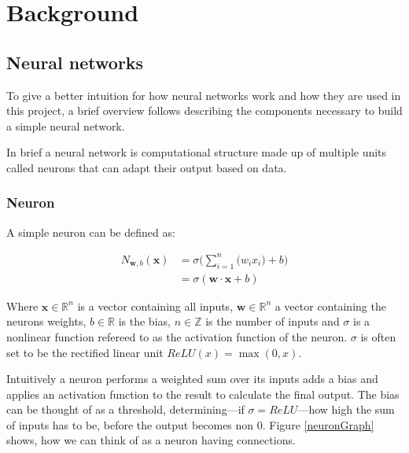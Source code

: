 
\newcommand{\neuronSum}[1][n]{
	\sigma\Bigg(\sum_{i=1}^{#1}{\Big(w_i x_i\Big)} + b\Bigg)
}

\chapter{Background}
\section{Neural networks}
To give a better intuition for how neural networks work and how they are used in this project, a brief overview follows describing the components necessary to build a simple neural network.

In brief a neural network is computational structure made up of multiple units called neurons that can adapt their output based on data.


\subsection{Neuron}
A simple neuron can be defined as:

\begin{equation}
\begin{split}
	N_{\bm w, b}(\bm{x}) & = \neuronSum[n] \\
 	& = \sigma (\bm{w} \cdot \bm{x} + b)
\end{split}
\end{equation}

Where $\bm{x} \in \mathbb{R}^n$ is a vector containing all inputs, $ \bm{w} \in \mathbb{R}^n$ a vector containing the neurons weights, $b \in \mathbb{R}$ is the bias, $n \in \mathbb{Z}$ is the number of inputs and $\sigma$ is a nonlinear function refereed to as the activation function of the neuron. $\sigma$ is often set to be the rectified linear unit $ReLU(x) = \max(0, x)$.

Intuitively a neuron performs a weighted sum over its inputs adds a bias and applies an activation function to the result to calculate the final output. The bias can be thought of as a threshold, determining---if $\sigma = ReLU$---how high the sum of inputs has to be, before the output becomes non 0. Figure \ref{neuronGraph} shows, how we can think of as a neuron having connections.

\neuronGraph{p}{$\displaystyle{\neuronSum[3]}$}


